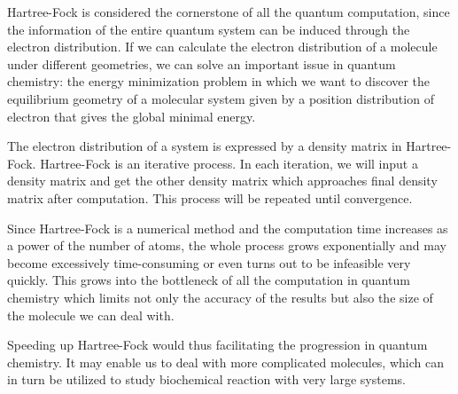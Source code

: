 \documentclass[twoside]{article}
\begin{document}

Hartree-Fock is considered the cornerstone of all the quantum computation, since the information of the entire quantum system can be induced through the electron distribution. If we can calculate the electron distribution of a molecule under different geometries, we can solve an important issue in quantum chemistry: the energy minimization problem in which we want to discover the equilibrium geometry of a molecular system given by a position distribution of electron that gives the global minimal energy. 

 
 
The electron distribution of a system is expressed by a density matrix in Hartree-Fock.
Hartree-Fock is an iterative process. In each iteration, we will input a density matrix and get the other density matrix which approaches final density matrix after computation. This process will be repeated until convergence.

Since Hartree-Fock is a numerical method and the computation time increases as a power of the number of atoms, the whole process grows exponentially and may become excessively time-consuming or even turns out to be infeasible very quickly.
This grows into the bottleneck of all the computation in quantum chemistry which limits not only the accuracy of the results but also the size of the molecule we can deal with.

Speeding up Hartree-Fock would thus facilitating the progression in quantum chemistry. It may enable us to deal with more complicated molecules, which can in turn be utilized to study biochemical reaction with very large systems. 



\end{document}
